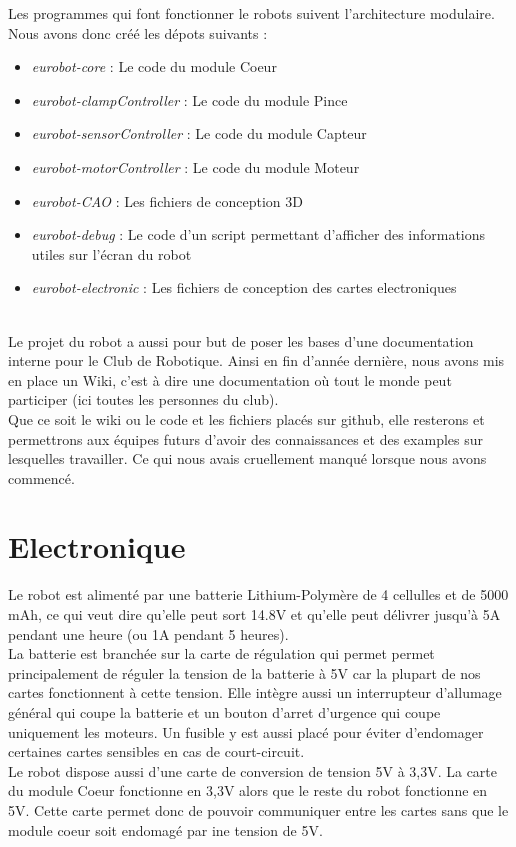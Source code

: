 Les programmes qui font fonctionner le robots suivent l'architecture modulaire. Nous avons donc créé les dépots suivants :\\
\begin{itemize}
	\item \textit{eurobot-core} : Le code du module Coeur
	\item \textit{eurobot-clampController} : Le code du module Pince
	\item \textit{eurobot-sensorController} : Le code du module Capteur
	\item \textit{eurobot-motorController} : Le code du module Moteur
	\item \textit{eurobot-CAO} : Les fichiers de conception 3D
	\item \textit{eurobot-debug} : Le code d'un script permettant d'afficher des informations utiles sur l'écran du robot
	\item \textit{eurobot-electronic} : Les fichiers de conception des cartes electroniques
\end{itemize}\ \\

Le projet du robot a aussi pour but de poser les bases d'une documentation interne pour le Club de Robotique. Ainsi en fin d'année dernière, nous avons mis en place un Wiki, c'est à dire une documentation où tout le monde peut participer (ici toutes les personnes du club).\\

Que ce soit le wiki ou le code et les fichiers placés sur github, elle resterons et permettrons aux équipes futurs d'avoir des connaissances et des examples sur lesquelles travailler. Ce qui nous avais cruellement manqué lorsque nous avons commencé.

\section{Electronique}
Le robot est alimenté par une batterie Lithium-Polymère de 4 cellulles et de 5000 mAh, ce qui veut dire qu'elle peut sort 14.8V et qu'elle peut délivrer jusqu'à 5A pendant une heure (ou 1A pendant 5 heures). \\

La batterie est branchée sur la carte de régulation qui permet permet principalement de réguler la tension de la batterie à 5V car la plupart de nos cartes fonctionnent à cette tension. Elle intègre aussi un interrupteur d'allumage général qui coupe la batterie et un bouton d'arret d'urgence qui coupe uniquement les moteurs. Un fusible y est aussi placé pour éviter d'endomager certaines cartes sensibles en cas de court-circuit. \\

Le robot dispose aussi d'une carte de conversion de tension 5V à 3,3V. La carte du module Coeur fonctionne en 3,3V alors que le reste du robot fonctionne en 5V. Cette carte permet donc de pouvoir communiquer entre les cartes sans que le module coeur soit endomagé par ine tension de 5V.

